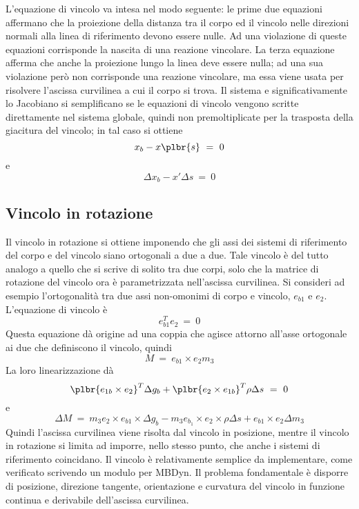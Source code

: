 \documentclass[12pt,dvips,fleqn]{article}
\begin{document}
L'equazione di vincolo va intesa nel modo seguente: le prime due equazioni
affermano che la proiezione della distanza tra il corpo ed il vincolo nelle
direzioni normali alla linea di riferimento devono essere nulle. 
Ad una violazione di queste equazioni corrisponde la nascita di una reazione
vincolare.
La terza equazione afferma che anche la proiezione lungo la linea deve
essere nulla; ad una sua violazione per\`{o} non corrisponde una reazione
vincolare, ma essa viene usata per risolvere l'ascissa curvilinea a cui il
corpo si trova.
Il sistema e significativamente lo Jacobiano si semplificano se le equazioni
di vincolo vengono scritte direttamente nel sistema globale, quindi non
premoltiplicate per la trasposta della giacitura del vincolo; in tal caso si
ottiene
\begin{displaymath}
    x_b-x\plbr{s} \ = \ 0
\end{displaymath}
e 
\begin{displaymath}
    \Delta{x_b}-x'\Delta{s} \ = \ 0
\end{displaymath}

\subsection*{Vincolo in rotazione}
Il vincolo in rotazione si ottiene imponendo che gli assi dei sistemi di
riferimento del corpo e del vincolo siano ortogonali a due a due.
Tale vincolo \`{e} del tutto analogo a quello che si scrive di solito tra
due corpi, solo che la matrice di rotazione del vincolo ora \`{e}
parametrizzata nell'ascissa curvilinea.
Si consideri ad esempio l'ortogonalit\`{a} tra due assi non-omonimi di corpo
e vincolo, $ e_{b1} $ e $ e_2 $.
L'equazione di vincolo \`{e}
\begin{displaymath}
    e_{b1}^Te_2 \ = \ 0
\end{displaymath}
Questa equazione d\`{a} origine ad una coppia che agisce attorno all'asse
ortogonale ai due che definiscono il vincolo, quindi
\begin{displaymath}
    M \ = \ e_{b1}\times{e_2}m_3 
\end{displaymath}
La loro linearizzazione d\`{a}
\begin{displaymath}
    \plbr{e_{1b}\times{e_2}}^T\Delta{g_b}
    +\plbr{e_2\times{e_{1b}}}^T\rho\Delta{s} \ = \ 0
\end{displaymath}
e
\begin{displaymath}
    \Delta{M} \ = \
        m_3e_2\times{e_{b1}}\times\Delta{g_b}
	-m_3e_{b_1}\times{e_2}\times\rho\Delta{s}
	+e_{b1}\times{e_2}\Delta{m_3}
\end{displaymath}
Quindi l'ascissa curvilinea viene risolta dal vincolo in posizione, mentre
il vincolo in rotazione si limita ad imporre, nello stesso punto, che anche
i sistemi di riferimento coincidano.
Il vincolo \`{e} relativamente semplice da implementare, come verificato
scrivendo un modulo per MBDyn. 
Il problema fondamentale \`{e} disporre di posizione, direzione tangente,
orientazione e curvatura del vincolo in funzione continua e derivabile
dell'ascissa curvilinea.
\end{document}
